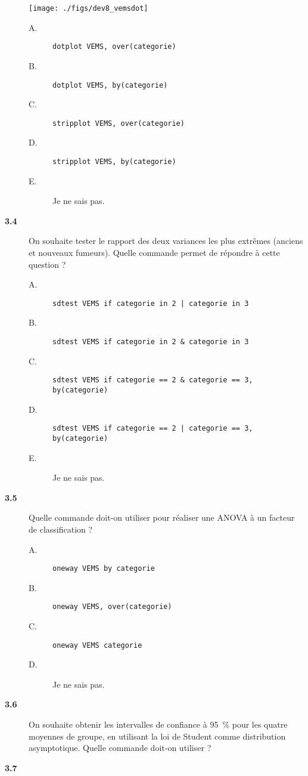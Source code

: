 \begin{description}
\begin{center}
  \texttt{[image: ./figs/dev8\_vemsdot]}
\end{center}
\begin{description}
\item[A.] \verb|dotplot VEMS, over(categorie)|
\item[B.] \verb|dotplot VEMS, by(categorie)|
\item[C.] \verb|stripplot VEMS, over(categorie)|
\item[D.] \verb|stripplot VEMS, by(categorie)|
\item[E.] Je ne sais pas.
\end{description}
\item[\bf 3.4] On souhaite tester le rapport des deux variances les plus
  extrêmes (anciens et nouveaux fumeurs). Quelle commande permet de répondre
  à cette question ? 
\begin{description}
\item[A.] \verb+sdtest VEMS if categorie in 2 | categorie in 3+
\item[B.] \verb+sdtest VEMS if categorie in 2 & categorie in 3+
\item[C.] \verb+sdtest VEMS if categorie == 2 & categorie == 3, by(categorie)+
\item[D.] \verb+sdtest VEMS if categorie == 2 | categorie == 3, by(categorie)+
\item[E.] Je ne sais pas.
\end{description}
\item[\bf 3.5] Quelle commande doit-on utiliser pour réaliser une ANOVA à un
  facteur de classification ? 
\begin{description}
\item[A.] \verb|oneway VEMS by categorie|
\item[B.] \verb|oneway VEMS, over(categorie)|
\item[C.] \verb|oneway VEMS categorie|
\item[D.] Je ne sais pas.
\end{description}
\item[\bf 3.6] On souhaite obtenir les intervalles de confiance à 95~\% pour
  les quatre moyennes de groupe, en utilisant la loi de Student comme
  distribution asymptotique. Quelle commande doit-on utiliser ?

\item[\bf 3.7] 
\end{description}


